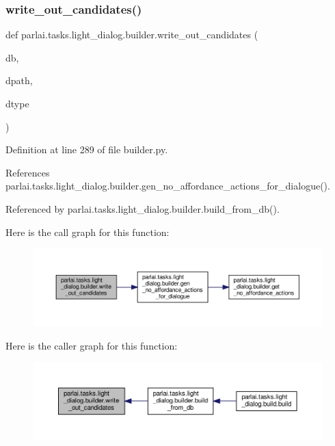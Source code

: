 \subsubsection{\texorpdfstring{write\+\_\+out\+\_\+candidates()}{write\_out\_candidates()}}
{\footnotesize\ttfamily def parlai.\+tasks.\+light\+\_\+dialog.\+builder.\+write\+\_\+out\+\_\+candidates (\begin{DoxyParamCaption}\item[{}]{db,  }\item[{}]{dpath,  }\item[{}]{dtype }\end{DoxyParamCaption})}



Definition at line 289 of file builder.\+py.



References parlai.\+tasks.\+light\+\_\+dialog.\+builder.\+gen\+\_\+no\+\_\+affordance\+\_\+actions\+\_\+for\+\_\+dialogue().



Referenced by parlai.\+tasks.\+light\+\_\+dialog.\+builder.\+build\+\_\+from\+\_\+db().

Here is the call graph for this function\+:
\nopagebreak
\begin{figure}[H]
\begin{center}
\leavevmode
\includegraphics[width=350pt]{namespaceparlai_1_1tasks_1_1light__dialog_1_1builder_a25aca9f28e4406290624e1d0c5cce0d6_cgraph}
\end{center}
\end{figure}
Here is the caller graph for this function\+:
\nopagebreak
\begin{figure}[H]
\begin{center}
\leavevmode
\includegraphics[width=350pt]{namespaceparlai_1_1tasks_1_1light__dialog_1_1builder_a25aca9f28e4406290624e1d0c5cce0d6_icgraph}
\end{center}
\end{figure}


